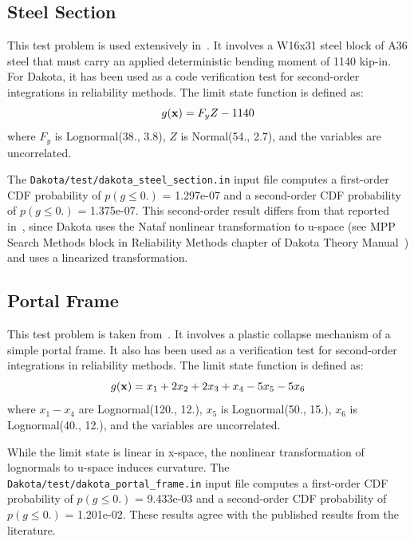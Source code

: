 \subsection{Steel Section}\label{additional:steel_section}

This test problem is used extensively in~\cite{Hal00}. It involves a
W16x31 steel block of A36 steel that must carry an applied
deterministic bending moment of 1140 kip-in. For Dakota, it has been
used as a code verification test for second-order integrations in
reliability methods. The limit state function is defined as:
\begin{equation}
g({\bf x}) = F_y Z - 1140
\end{equation}
where $F_y$ is Lognormal(38., 3.8), $Z$ is Normal(54., 2.7), and the
variables are uncorrelated.

The \texttt{Dakota/test/dakota\_steel\_section.in} input file computes
a first-order CDF probability of $p(g \leq 0.)$ = 1.297e-07 and a
second-order CDF probability of $p(g \leq 0.)$ = 1.375e-07. This
second-order result differs from that reported in~\cite{Hal00}, since
Dakota uses the Nataf nonlinear transformation to u-space (see MPP
Search Methods block in Reliability Methods chapter of Dakota Theory
Manual~\cite{TheoMan}) and \cite{Hal00} uses a linearized
transformation.

\subsection{Portal Frame}\label{additional:portal_frame}


This test problem is taken from~\cite{Tve90,Hon99}. It involves a
plastic collapse mechanism of a simple portal frame. It also has been
used as a verification test for second-order integrations in
reliability methods. The limit state function is defined as:
\begin{equation}
g({\bf x}) = x_1 + 2 x_2 + 2 x_3 + x_4 - 5 x_5 - 5 x_6
\end{equation}
where $x_1 - x_4$ are Lognormal(120., 12.), $x_5$ is Lognormal(50.,
15.), $x_6$ is Lognormal(40., 12.), and the variables are uncorrelated.

While the limit state is linear in x-space, the nonlinear
transformation of lognormals to u-space induces curvature. The
\texttt{Dakota/test/dakota\_portal\_frame.in} input file computes a
first-order CDF probability of $p(g \leq 0.)$ = 9.433e-03 and a
second-order CDF probability of $p(g \leq 0.)$ = 1.201e-02. These
results agree with the published results from the literature.

